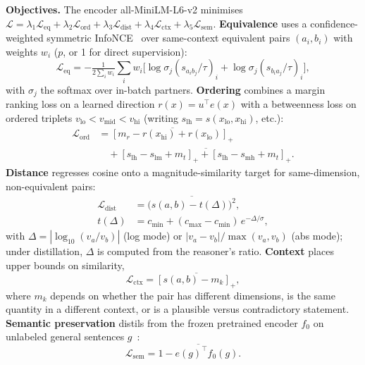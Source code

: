 \documentclass[conference]{IEEEtran}
\newcommand{\Lq}{\mathcal{L}}
\begin{document}
\textbf{Objectives.} The encoder all-MiniLM-L6-v2 minimises
$\Lq=\lambda_1\Lq_{\mathrm{eq}}+\lambda_2\Lq_{\mathrm{ord}}+\lambda_3\Lq_{\mathrm{dist}}+\lambda_4\Lq_{\mathrm{ctx}}+\lambda_5\Lq_{\mathrm{sem}}$.
\textbf{Equivalence} uses a confidence-weighted symmetric InfoNCE~\cite{oord2018cpc} over same-context equivalent pairs
$(a_i,b_i)$ with weights $w_i$ ($p$, or 1 for direct supervision):
\begin{equation}
\Lq_{\mathrm{eq}}=-\tfrac{1}{2\sum_i w_i}\textstyle\sum_i w_i\big[\log\sigma_j(s_{a_ib_j}/\tau)_i+\log\sigma_j(s_{b_ia_j}/\tau)_i\big],
\end{equation}
with $\sigma_j$ the softmax over in-batch partners. \textbf{Ordering} combines a margin ranking loss on
a learned direction $r(x)=u^\top e(x)$ with a betweenness loss on ordered triplets
$v_{\mathrm{lo}}<v_{\mathrm{mid}}<v_{\mathrm{hi}}$ (writing $s_{\mathrm{lh}}=s(x_{\mathrm{lo}},x_{\mathrm{hi}})$, etc.):
\begin{align}
\Lq_{\mathrm{ord}}&=\overline{[m_r-r(x_{\mathrm{hi}})+r(x_{\mathrm{lo}})]_+}\nonumber\\
&\quad+\overline{[s_{\mathrm{lh}}-s_{\mathrm{lm}}+m_t]_+ +[s_{\mathrm{lh}}-s_{\mathrm{mh}}+m_t]_+}.
\end{align}
\textbf{Distance} regresses cosine onto a magnitude-similarity target for same-dimension, non-equivalent pairs:
\begin{align}
\Lq_{\mathrm{dist}}&=\overline{\big(s(a,b)-t(\Delta)\big)^2},\\
t(\Delta)&=c_{\min}+(c_{\max}-c_{\min})\,e^{-\Delta/\sigma},\nonumber
\end{align}
with $\Delta=|\log_{10}(v_a/v_b)|$ (log mode) or $|v_a-v_b|/\max(v_a,v_b)$ (abs mode); under distillation, $\Delta$ is
computed from the reasoner's ratio. \textbf{Context} places upper bounds on similarity,
\begin{equation}
\Lq_{\mathrm{ctx}}=\overline{[s(a,b)-m_k]_+},
\end{equation}
where $m_k$ depends on whether the pair has different dimensions, is the same quantity in a different context, or is a
plausible versus contradictory statement. \textbf{Semantic preservation} distils from the frozen pretrained encoder
$f_0$ on unlabeled general sentences $g$~\cite{reimers2020multilingual}:
\begin{equation}
\Lq_{\mathrm{sem}}=\overline{1-e(g)^\top f_0(g)}.
\end{equation}
\end{document}
